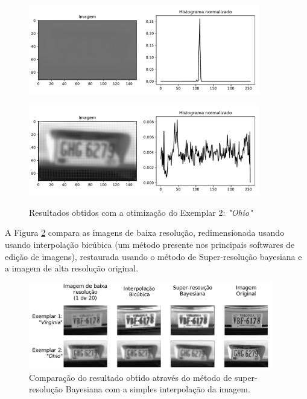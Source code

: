 \begin{figure}
	\centering
	\caption{Resultados obtidos com a otimização do Exemplar 2: \emph{"Ohio"}}
	\label{fig:result_histograms1}
	\begin{minipage}[b]{.99\linewidth}
		\includegraphics[width = 0.9\textwidth]{./figures/results_figures/histograma2.pdf}
		\label{fig:result_histograms1_output}
	\end{minipage}	

	\begin{minipage}[b]{.99\linewidth}
		\includegraphics[width = 0.9\textwidth]{./figures/results_figures/histograma1.pdf}
		\label{fig:result_histograms1_equalized}
	\end{minipage}	
	
\end{figure}

A Figura \ref{fig:results_compare} compara as imagens de baixa resolução, redimensionada usando usando interpolação bicúbica (um método presente nos principais softwares de edição de imagens), restaurada usando o método de Super-resolução bayesiana e a imagem de alta resolução original.

\begin{figure}
	\centering
	\caption{Comparação do resultado obtido através do método de super-resolução Bayesiana com a simples interpolação da imagem.}
	\label{fig:results_compare}
	\includegraphics[width = 0.95\textwidth]{./figures/results_figures/result_compare.pdf}
\end{figure}

